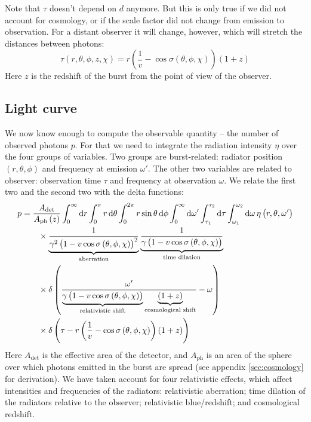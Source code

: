 \documentclass[manuscript]{aastex}
\begin{document}
Note that $\tau$ doesn't depend on $d$ anymore. But this is only true if we did not account for cosmology, or if the scale factor did not change from emission to observation. For a distant observer it will change, however, which will stretch the distances between photons:
\begin{equation}
\tau \left(r, \theta, \phi, z, \chi \right) = r\left( \frac{1}{v} - \cos\sigma\left( \theta, \phi, \chi \right) \right) \left( 1 + z \right)
\end{equation}
Here $z$ is the redshift of the burst from the point of view of the observer.

\subsection{Light curve}
We now know enough to compute the observable quantity -- the number of
observed photons $p$. For that we need to integrate the radiation
intensity $\eta$ over the four groups of variables. Two groups are
burst-related: radiator position $\left(r, \theta, \phi\right)$ and
frequency at emission $\omega'$. The other two variables are related
to observer: observation time $\tau$ and frequency at observation
$\omega$. We relate the first two and the second two with the delta
functions:
\begin{align}
p &= \frac{A_\text{det}}{A_\text{ph}\left(z\right)} \int_0^\infty \dif r \int_0^{\pi} r \dif \theta \int_0^{2\pi} r \sin{\theta} \dif \phi \int_0^\infty \dif \omega' \int_{\tau_1}^{\tau_2} \dif \tau \int_{\omega_1}^{\omega_2} \dif \omega \, \eta\left( r, \theta, \omega' \right) \nonumber\\
&\qquad {} \times \underbrace{\frac{1}{\gamma^2\left( 1 - v \cos\sigma\left(\theta, \phi, \chi\right) \right)^2}}_{\text{aberration}} \underbrace{\frac{1}{\gamma\left( 1 - v \cos\sigma\left(\theta, \phi, \chi\right) \right)}}_{\text{time dilation}} \nonumber\\
&\qquad {} \times \delta\left( \frac{\omega'}{\underbrace{\gamma \left( 1 - v\cos\sigma\left(\theta, \phi, \chi\right) \right)}_{\text{relativistic shift}} \underbrace{\left(1+z\right)}_{\text{cosmological shift}}} - \omega \right) \nonumber\\
&\qquad {} \times \delta\left( \tau - r\left( \frac{1}{v} - \cos\sigma\left(\theta, \phi, \chi\right) \right) \left(1+z\right) \right)
\end{align}
Here $A_\text{det}$ is the effective area of the detector, and $A_\text{ph}$ is an area of the sphere over which photons emitted in the burst are spread (see appendix \ref{sec:cosmology} for derivation). We have taken account for four relativistic effects, which affect intensities and frequencies of the radiators: relativistic aberration; time dilation of the radiators relative to the observer; relativistic blue/redshift; and cosmological redshift.
\end{document}
